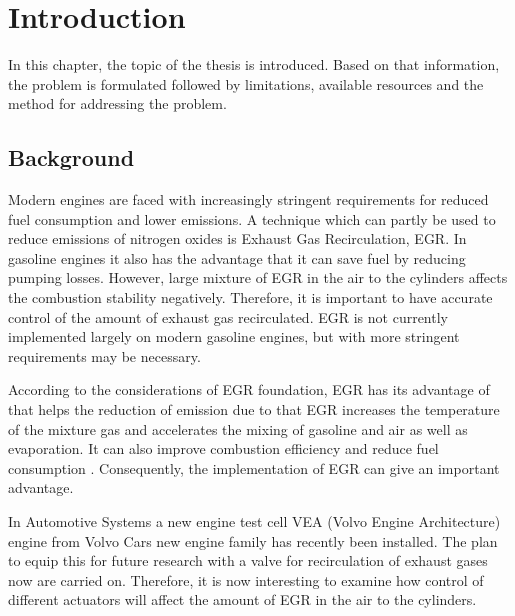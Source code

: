 \chapter{Introduction}\label{cha:intro}
In this chapter, the topic of the thesis is introduced. Based on that information, the problem is formulated followed by limitations, available resources and the method for addressing the problem.

\section{Background}
Modern engines are faced with increasingly stringent requirements for reduced fuel consumption and lower emissions. A technique which can partly be used to reduce emissions of nitrogen oxides is Exhaust Gas Recirculation, EGR. In gasoline engines it also has the advantage that it can save fuel by reducing pumping losses. However, large mixture of EGR in the air to the cylinders affects the combustion stability negatively. Therefore, it is important to have accurate control of the amount of exhaust gas recirculated. EGR is not currently implemented largely on modern gasoline engines, but with more stringent requirements may be necessary. 

According to the considerations of EGR foundation, EGR has its advantage of that helps the reduction of emission due to that EGR increases the temperature of the mixture gas and accelerates the mixing of gasoline and air as well as evaporation. It can also improve combustion efficiency and reduce fuel consumption \citep{olsson2003effect} \citep{yokomura2003egr}. Consequently, the implementation of EGR can give an important advantage.

In Automotive Systems a new engine test cell VEA (Volvo Engine Architecture) engine from Volvo Cars new engine family has recently been installed. The plan to equip this for future research with a valve for recirculation of exhaust gases now are carried on. Therefore, it is now interesting to examine how control of different actuators will affect the amount of EGR in the air to the cylinders.


